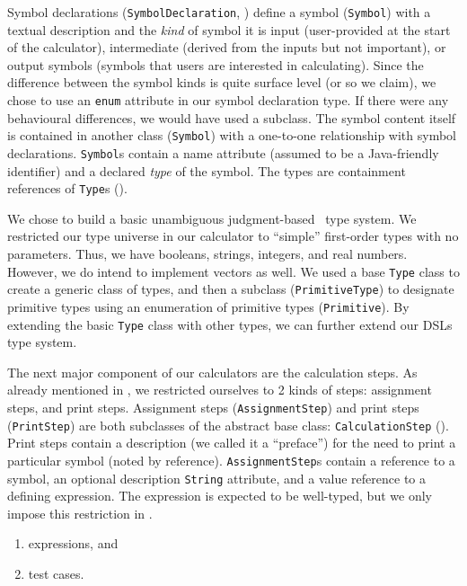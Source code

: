 \documentclass[11pt,fleqn]{article}
\begin{document}
Symbol declarations (\lstinline{SymbolDeclaration},
) define a symbol (\lstinline{Symbol}) with a
textual description and the \textit{kind} of symbol it is \textemdash{} input
(user-provided at the start of the calculator), intermediate (derived from the
inputs but not important), or output symbols (symbols that users are interested
in calculating). Since the difference between the symbol kinds is quite surface
level (or so we claim), we chose to use an \lstinline{enum} attribute in our
symbol declaration type. If there were any behavioural differences, we would
have used a subclass. The symbol content itself is contained in another class
(\lstinline{Symbol}) with a one-to-one relationship with symbol declarations.
\lstinline{Symbol}s contain a name attribute (assumed to be a Java-friendly
identifier) and a declared \textit{type} of the symbol. The types are
containment references of \lstinline{Type}s ().  

We chose to build a basic unambiguous judgment-based~\cite{nlab:judgment} type
system. We restricted our type universe in our calculator to ``simple''
first-order types with no parameters. Thus, we have booleans, strings, integers,
and real numbers. However, we do intend to implement vectors as well. We used a
base \lstinline{Type} class to create a generic class of types, and then a
subclass (\lstinline{PrimitiveType}) to designate primitive types using an
enumeration of primitive types (\lstinline{Primitive}). By extending the basic
\lstinline{Type} class with other types, we can further extend our DSLs type
system.

The next major component of our calculators are the calculation steps. As
already mentioned in , we restricted
ourselves to 2 kinds of steps: assignment steps, and print steps. Assignment
steps (\lstinline{AssignmentStep}) and print steps (\lstinline{PrintStep}) are
both subclasses of the abstract base class: \lstinline{CalculationStep}
(). Print steps contain a description (we called it
a ``preface'') for the need to print a particular symbol (noted by reference).
\lstinline{AssignmentStep}s contain a reference to a symbol, an optional
description \lstinline{String} attribute, and a value reference to a defining
expression. The expression is expected to be well-typed, but we only impose this
restriction in .

\begin{enumerate}
  \item expressions, and
  \item test cases.
\end{enumerate}
\end{document}
